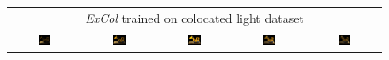 \begingroup
\begin{figure}[!htb]
    \centering
    \setlength\tabcolsep{2pt}
    \begin{tabular*}{\textwidth}{ c c c c c }
        \multicolumn{5}{c}{\textit{ExCol} trained on colocated light dataset} \\
          \includegraphics[width=0.19\textwidth]{figures/results/arb_set/dynamic_light/excol_col_vc0_ld-90.png}
        & \includegraphics[width=0.19\textwidth]{figures/results/arb_set/dynamic_light/excol_col_vc0_ld-60.png}
        & \includegraphics[width=0.19\textwidth]{figures/results/arb_set/dynamic_light/excol_col_vc0_ld0.png}
        & \includegraphics[width=0.19\textwidth]{figures/results/arb_set/dynamic_light/excol_col_vc0_ld60.png} 
        & \includegraphics[width=0.19\textwidth]{figures/results/arb_set/dynamic_light/excol_col_vc0_ld90.png} \\
        

\end{tabular*}
\end{figure}
